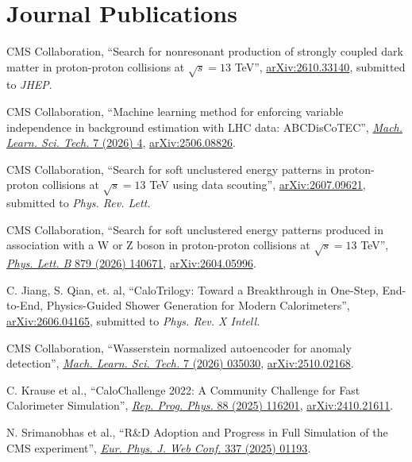 \section{Journal Publications}
\begin{nbdescription}[leftmargin=12pt,font=\normalfont,labelsep=0em]
\item CMS Collaboration, ``Search for nonresonant production of strongly coupled dark matter in proton-proton collisions at $\sqrt{s}=13$ TeV'', \href{https://arxiv.org/abs/2610.33140}{arXiv:2610.33140}, submitted to \emph{JHEP}. %
\item CMS Collaboration, ``Machine learning method for enforcing variable independence in background estimation with LHC data: ABCDisCoTEC'', \href{https://doi.org/10.1088/2632-2153/ae8c11}{\emph{Mach. Learn. Sci. Tech.} 7 (2026) 4}, \href{https://arxiv.org/abs/2506.08826}{arXiv:2506.08826}. %
\item CMS Collaboration, ``Search for soft unclustered energy patterns in proton-proton collisions at $\sqrt{s} = 13$ TeV using data scouting'', \href{https://arxiv.org/abs/2607.09621}{arXiv:2607.09621}, submitted to \emph{Phys. Rev. Lett.} %
\item CMS Collaboration, ``Search for soft unclustered energy patterns produced in association with a W or Z boson in proton-proton collisions at $\sqrt{s} = 13$ TeV'', \href{https://doi.org/10.1016/j.physletb.2026.140671}{\emph{Phys. Lett. B} 879 (2026) 140671}, \href{https://arxiv.org/abs/2604.05996}{arXiv:2604.05996}. %
\item C. Jiang, S. Qian, et. al, ``CaloTrilogy: Toward a Breakthrough in One-Step, End-to-End, Physics-Guided Shower Generation for Modern Calorimeters'', \href{https://arxiv.org/abs/2606.04165}{arXiv:2606.04165}, submitted to \emph{Phys. Rev. X Intell.} %
\item CMS Collaboration, ``Wasserstein normalized autoencoder for anomaly detection'', \href{https://doi.org/10.1088/2632-2153/ae6168}{\emph{Mach. Learn. Sci. Tech.} 7 (2026) 035030}, \href{https://arxiv.org/abs/2510.02168}{arXiv:2510.02168}. %
\item C. Krause et al., ``CaloChallenge 2022: A Community Challenge for Fast Calorimeter Simulation'', \href{https://doi.org/10.1088/1361-6633/ae1304}{\emph{Rep. Prog. Phys.} 88 (2025) 116201}, \href{https://arxiv.org/abs/2410.21611}{arXiv:2410.21611}. %
\item N. Srimanobhas et al., ``R\&D Adoption and Progress in Full Simulation of the CMS experiment'', \href{https://doi.org/10.1051/epjconf/202533701193}{\emph{Eur. Phys. J. Web Conf.} 337 (2025) 01193}. %

\end{nbdescription}

